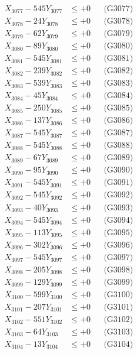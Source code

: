 \documentclass[a4paper,10pt]{article}
\begin{document}
{\begin{align}
X_{3077} - 545Y_{3077} &\leq +0 && \text{(G3077)} \\
X_{3078} - 24Y_{3078} &\leq +0 && \text{(G3078)} \\
X_{3079} - 62Y_{3079} &\leq +0 && \text{(G3079)} \\
X_{3080} - 89Y_{3080} &\leq +0 && \text{(G3080)} \\
\allowbreak
X_{3081} - 545Y_{3081} &\leq +0 && \text{(G3081)} \\
X_{3082} - 239Y_{3082} &\leq +0 && \text{(G3082)} \\
X_{3083} - 539Y_{3083} &\leq +0 && \text{(G3083)} \\
X_{3084} - 45Y_{3084} &\leq +0 && \text{(G3084)} \\
X_{3085} - 250Y_{3085} &\leq +0 && \text{(G3085)} \\
X_{3086} - 137Y_{3086} &\leq +0 && \text{(G3086)} \\
X_{3087} - 545Y_{3087} &\leq +0 && \text{(G3087)} \\
X_{3088} - 545Y_{3088} &\leq +0 && \text{(G3088)} \\
X_{3089} - 67Y_{3089} &\leq +0 && \text{(G3089)} \\
X_{3090} - 95Y_{3090} &\leq +0 && \text{(G3090)} \\
\allowbreak
X_{3091} - 545Y_{3091} &\leq +0 && \text{(G3091)} \\
X_{3092} - 545Y_{3092} &\leq +0 && \text{(G3092)} \\
X_{3093} - 40Y_{3093} &\leq +0 && \text{(G3093)} \\
X_{3094} - 545Y_{3094} &\leq +0 && \text{(G3094)} \\
X_{3095} - 113Y_{3095} &\leq +0 && \text{(G3095)} \\
X_{3096} - 302Y_{3096} &\leq +0 && \text{(G3096)} \\
X_{3097} - 545Y_{3097} &\leq +0 && \text{(G3097)} \\
X_{3098} - 205Y_{3098} &\leq +0 && \text{(G3098)} \\
X_{3099} - 129Y_{3099} &\leq +0 && \text{(G3099)} \\
X_{3100} - 599Y_{3100} &\leq +0 && \text{(G3100)} \\
\allowbreak
X_{3101} - 207Y_{3101} &\leq +0 && \text{(G3101)} \\
X_{3102} - 551Y_{3102} &\leq +0 && \text{(G3102)} \\
X_{3103} - 64Y_{3103} &\leq +0 && \text{(G3103)} \\
X_{3104} - 13Y_{3104} &\leq +0 && \text{(G3104)} \\

\end{align}}
\end{document}
